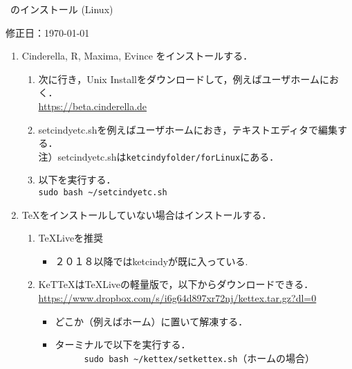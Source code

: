 \documentclass{ujarticle}
\begin{document}
\begin{center}
\ketcindy\ のインストール (Linux)
\end{center}

\hfill 修正日：\today

\begin{enumerate}[\bf\large 1.]
\item Cinderella, R, Maxima, Evince をインストールする．
    \begin{enumerate}[(1)]
    \item 次に行き，Unix Installをダウンロードして，例えばユーザホームにおく．\\
       \hspace*{10mm}\url{https://beta.cinderella.de} 
    \item setcindyetc.shを例えばユーザホームにおき，テキストエディタで編集する．\\
      \hspace*{5mm}注）setcindyetc.shは\verb|ketcindyfolder/forLinux|にある．
    \item 以下を実行する．\\
       \hspace*{10mm}\verb|sudo bash ~/setcindyetc.sh|
    \end{enumerate}

\item \TeX をインストールしていない場合はインストールする．
 \begin{enumerate}[(1)]
 \item TeXLiveを推奨
    \begin{itemize}
    \item ２０１８以降ではketcindyが既に入っている.
    \end{itemize}
\item KeTTeXはTeXLiveの軽量版で，以下からダウンロードできる．\\
    \hspace*{6mm}\url{https://www.dropbox.com/s/i6g64d897xr72nj/kettex.tar.gz?dl=0}

    \begin{itemize}
    \item どこか（例えばホーム）に置いて解凍する．
    \item ターミナルで以下を実行する．\\
　　　\verb|sudo bash ~/kettex/setkettex.sh|（ホームの場合）
    \end{itemize}

 \end{enumerate}


\end{enumerate}
\end{document}

